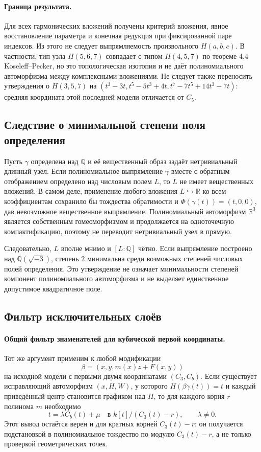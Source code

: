 \paragraph{Граница результата.}
Для всех гармонических вложений получены критерий вложения,
явное восстановление параметра и конечная редукция при фиксированной
паре индексов. Из этого не следует выпрямляемость произвольного
$H(a,b,c)$. В частности, тип узла
$H(5,6,7)$ совпадает с типом $H(4,5,7)$ по теореме 4.4
Koseleff--Pecker, но это топологическая изотопия и не даёт
полиномиального автоморфизма между комплексными вложениями.
Не следует также переносить утверждения о $H(3,5,7)$ на
$(t^3-3t,t^5-5t^3+4t,t^7-7t^5+14t^3-7t)$:
средняя координата этой последней модели отличается от $C_5$.

\subsection{Следствие о минимальной степени поля определения}

Пусть $\gamma$ определена над $\mathbb Q$ и её вещественный образ
задаёт нетривиальный длинный узел. Если полиномиальное выпрямление
$\gamma$ вместе с обратным отображением определено над числовым полем
$L$, то $L$ не имеет вещественных вложений.
В самом деле, применение любого вложения $L\hookrightarrow\mathbb R$
ко всем коэффициентам сохранило бы тождества обратимости и
$\Phi(\gamma(t))=(t,0,0)$, дав невозможное вещественное выпрямление.
Полиномиальный автоморфизм $\mathbb R^3$ является собственным
гомеоморфизмом и продолжается на одноточечную компактификацию,
поэтому не переводит нетривиальный узел в прямую.

Следовательно, $L$ вполне мнимо и $[L:\mathbb Q]$ чётно.
Если выпрямление построено над $\mathbb Q(\sqrt{-3})$, степень $2$
минимальна среди возможных степеней числовых полей определения.
Это утверждение не означает минимальности степеней компонент
полиномиального автоморфизма и не выделяет единственное допустимое
квадратичное поле.

\subsection{Фильтр исключительных слоёв}
\paragraph{Общий фильтр знаменателей для кубической первой координаты.}
Тот же аргумент применим к любой модификации
\[
 \beta=(x,y,m(x)z+F(x,y))
\]
на исходной модели с первыми двумя координатами $(C_3,C_b)$.
Если существует исправляющий автоморфизм $(x,H,W)$, у которого
$H(\beta\gamma(t))=t$ и каждый приведённый центр становится графиком
над $H$, то для каждого корня $r$ полинома $m$ необходимо
\[
 t=\lambda C_b(t)+\mu\quad\text{в }k[t]/(C_3(t)-r),\qquad\lambda\ne0.
\]
Этот вывод остаётся верен и для кратных корней $C_3(t)-r$:
он получается подстановкой в полиномиальное тождество по модулю
$C_3(t)-r$, а не только проверкой геометрических точек.

